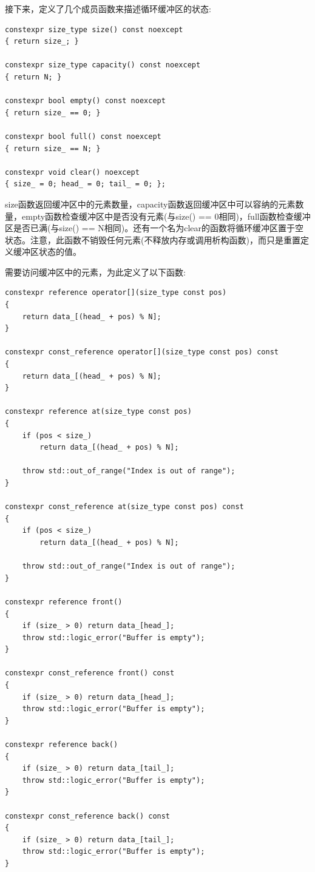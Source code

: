 接下来，定义了几个成员函数来描述循环缓冲区的状态:

\begin{lstlisting}[style=styleCXX]
constexpr size_type size() const noexcept
{ return size_; }

constexpr size_type capacity() const noexcept
{ return N; }

constexpr bool empty() const noexcept
{ return size_ == 0; }

constexpr bool full() const noexcept
{ return size_ == N; }

constexpr void clear() noexcept
{ size_ = 0; head_ = 0; tail_ = 0; };
\end{lstlisting}

size函数返回缓冲区中的元素数量，capacity函数返回缓冲区中可以容纳的元素数量，empty函数检查缓冲区中是否没有元素(与size() == 0相同)，full函数检查缓冲区是否已满(与size() == N相同)。还有一个名为clear的函数将循环缓冲区置于空状态。注意，此函数不销毁任何元素(不释放内存或调用析构函数)，而只是重置定义缓冲区状态的值。

需要访问缓冲区中的元素，为此定义了以下函数:

\begin{lstlisting}[style=styleCXX]
constexpr reference operator[](size_type const pos)
{
	return data_[(head_ + pos) % N];
}

constexpr const_reference operator[](size_type const pos) const
{
	return data_[(head_ + pos) % N];
}

constexpr reference at(size_type const pos)
{
	if (pos < size_)
		return data_[(head_ + pos) % N];
		
	throw std::out_of_range("Index is out of range");
}

constexpr const_reference at(size_type const pos) const
{
	if (pos < size_)
		return data_[(head_ + pos) % N];
		
	throw std::out_of_range("Index is out of range");
}

constexpr reference front()
{
	if (size_ > 0) return data_[head_];
	throw std::logic_error("Buffer is empty");
}

constexpr const_reference front() const
{
	if (size_ > 0) return data_[head_];
	throw std::logic_error("Buffer is empty");
}

constexpr reference back()
{
	if (size_ > 0) return data_[tail_];
	throw std::logic_error("Buffer is empty");
}

constexpr const_reference back() const
{
	if (size_ > 0) return data_[tail_];
	throw std::logic_error("Buffer is empty");
}
\end{lstlisting}

